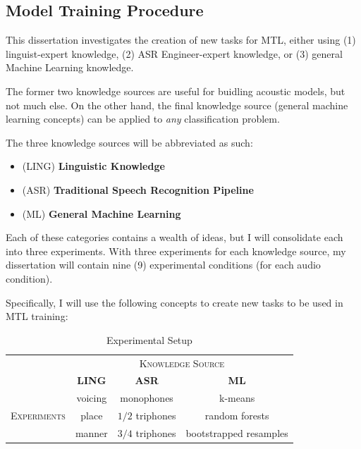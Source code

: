 \documentclass[10pt,a4paper]{article}
\begin{document}
\subsection{Model Training Procedure}

This dissertation investigates the creation of new tasks for MTL, either using (1) linguist-expert knowledge, (2) ASR Engineer-expert knowledge, or (3) general Machine Learning knowledge.

The former two knowledge sources are useful for buidling acoustic models, but not much else. On the other hand, the final knowledge source (general machine learning concepts) can be applied to \textit{any} classification problem.

The three knowledge sources will be abbreviated as such:
  
\begin{itemize}
\item  (\textsc{LING}) \textbf{Linguistic Knowledge} 
\item (\textsc{ASR}) \textbf{Traditional Speech Recognition Pipeline}
\item (\textsc{ML}) \textbf{General Machine Learning}
\end{itemize}


Each of these categories contains a wealth of ideas, but I will consolidate each into three experiments. With three experiments for each knowledge source, my dissertation will contain nine (9) experimental conditions (for each audio condition).

Specifically, I will use the following concepts to create new tasks to be used in MTL training:

\begin{table}[htbp]
  \centering
  \begin{adjustbox}{width=.75\textwidth}
    \begin{tabular}{cccc}
      \toprule
      & \multicolumn{3}{c}{\textsc{Knowledge Source}}\\
      & \textbf{LING} & \textbf{ASR} & \textbf{ML}\\
      \midrule
      \multirow{3}{*}{\textsc{Experiments}} & voicing & monophones &  k-means \\
      & place & $1/2$ triphones & random forests  \\
      & manner & $3/4$ triphones &  bootstrapped resamples  \\
      \bottomrule
    \end{tabular}
    \label{table:data}
  \end{adjustbox}
  
  \caption{Experimental Setup}
  
\end{table}
\end{document}
